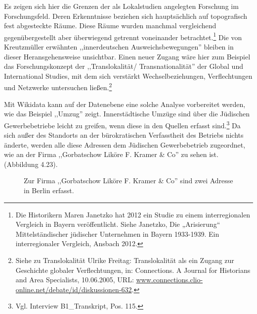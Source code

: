Es zeigen sich hier die Grenzen der als Lokalstudien angelegten Forschung im Forschungsfeld. Deren Erkenntnisse beziehen sich hauptsächlich auf topografisch fest abgesteckte Räume. Diese Räume wurden manchmal vergleichend gegenübergestellt aber überwiegend getrennt voneinander betrachtet.\footnote{Die Historikern Maren Janetzko hat 2012 ein Studie zu einem interregionalen Vergleich in Bayern veröffentlicht. Siehe Janetzko, Die „Arisierung“ Mittelständischer jüdischer Unternehmen in Bayern 1933-1939. Ein interregionaler Vergleich, Ansbach 2012.} Die von Kreutzmüller erwähnten ,,innerdeutschen Ausweichsbewegungen'' bleiben in dieser Heransgehensweise unsichtbar. Einen neuer Zugang wäre hier zum Beispiel das Forschungskonzept der ,,Translokalität/ Transnationalität'' der Global und International Studies, mit dem sich verstärkt Wechselbeziehungen, Verflechtungen und Netzwerke untersuchen ließen.\footnote{Siehe zu Translokalität Ulrike Freitag: Translokalität als ein Zugang zur Geschichte globaler Verflechtungen, in: Connections. A Journal for Historians and Area Specialists, 10.06.2005, URL: \url{www.connections.clio-online.net/debate/id/diskussionen-632}.} 

Mit Wikidata kann auf der Datenebene eine solche Analyse vorbereitet werden, wie das Beispiel ,,Umzug'' zeigt. Innerstädtische Umzüge sind über die Jüdischen Gewerbebetriebe leicht zu greifen, wenn diese in den Quellen erfasst sind.\footnote{Vgl. Interview B1\_Transkript, Pos. 115.} Da sich außer des Standorts an der bürokratischen Verfasstheit des Betriebs nichts änderte, werden alle diese Adressen dem Jüdischen Gewerbebetrieb zugeordnet, wie an der Firma ,,Gorbatschow Liköre F. Kramer \& Co'' zu sehen ist. (Abbildung 4.23).

\begin{figure}[h]
    \centering
    \caption{Zur Firma ,,Gorbatschow Liköre F. Kramer \& Co'' sind zwei Adresse in Berlin erfasst.}
    \label{fig:x cubed graph}
\end{figure}

